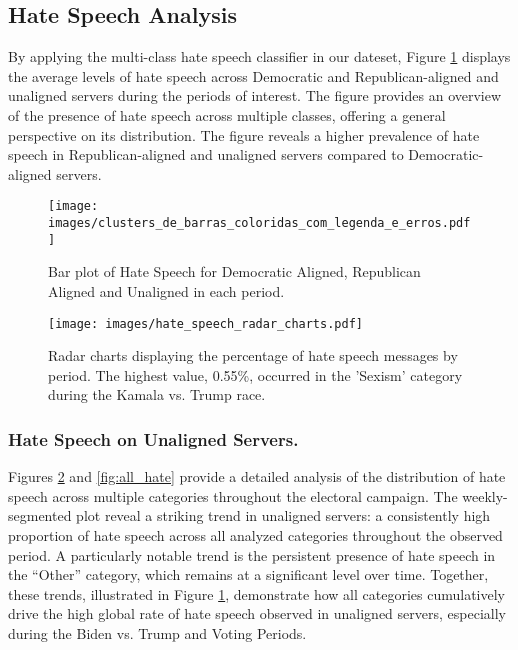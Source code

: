 \label{sec:embedding_results}

\subsection{Hate Speech Analysis}
\label{sec:hate_speech_results}

By applying the multi-class hate speech classifier in our dateset, Figure \ref{fig:bar-graph-toxic} displays the average levels of hate speech across Democratic and Republican-aligned and unaligned servers during the periods of interest. The figure provides an overview of the presence of hate speech across multiple classes, offering a general perspective on its distribution. The figure reveals a higher prevalence of hate speech in Republican-aligned and unaligned servers compared to Democratic-aligned servers. 

\begin{figure}[h]
    \centering
    \texttt{[image: images/clusters\_de\_barras\_coloridas\_com\_legenda\_e\_erros.pdf]}
    \caption{Bar plot of Hate Speech for Democratic Aligned, Republican Aligned and Unaligned in each period. }
    \label{fig:bar-graph-toxic}
\end{figure}
\begin{figure}[h]
    \centering
    \texttt{[image: images/hate\_speech\_radar\_charts.pdf]}
    \caption{Radar charts displaying the percentage of hate speech messages by period. The highest value, 0.55\%, occurred in the 'Sexism' category during the Kamala vs. Trump race.}
    \label{fig:radar}
\end{figure}

\subsubsection{Hate Speech on Unaligned Servers. \\}

Figures \ref{fig:radar} and \ref{fig:all_hate} provide a detailed analysis of the distribution of hate speech across multiple categories throughout the electoral campaign. The weekly-segmented plot reveal a striking trend in unaligned servers: a consistently high proportion of hate speech across all analyzed categories throughout the observed period. A particularly notable trend is the persistent presence of hate speech in the ``Other'' category, which remains at a significant level over time. Together, these trends, illustrated in Figure \ref{fig:bar-graph-toxic}, demonstrate how all categories cumulatively drive the high global rate of hate speech observed in unaligned servers, especially during the Biden vs. Trump and Voting Periods.

